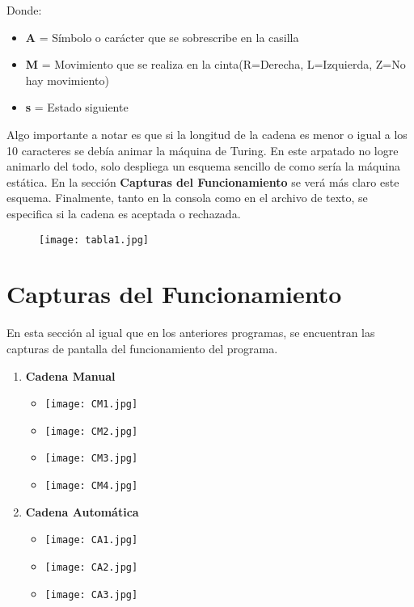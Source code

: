 \documentclass{article}
\begin{document}
	Donde: 
	\begin{itemize}
		\item \textbf{A} = Símbolo o carácter que se sobrescribe en la casilla
		\item \textbf{M} = Movimiento que se realiza en la cinta(R=Derecha, L=Izquierda, Z=No hay movimiento)
		\item \textbf{s} = Estado siguiente
		
	\end{itemize}
	
	Algo importante a notar es que si la longitud de la cadena es menor o igual a los 10 caracteres se debía animar la máquina de Turing. En este arpatado no logre animarlo del todo, solo despliega un esquema sencillo de como sería la máquina estática. En la sección \textbf{Capturas del Funcionamiento} se verá más claro este esquema.
	Finalmente, tanto en la consola como en el archivo de texto, se especifica si la cadena es aceptada o rechazada.
	
	\begin{figure}[h]
		\centering
		\texttt{[image: tabla1.jpg]}
	\end{figure}
	\section*{Capturas del Funcionamiento}
	En esta sección al igual que en los anteriores programas, se encuentran las capturas de pantalla del funcionamiento del programa.	
	\begin{enumerate}
		\item \textbf{Cadena Manual}
		\begin{itemize}
			\item \texttt{[image: CM1.jpg]}
			\item \texttt{[image: CM2.jpg]}
			\item \texttt{[image: CM3.jpg]}
			\item \texttt{[image: CM4.jpg]}
		\end{itemize}				
		\item \textbf{Cadena Automática}
		\begin{itemize}
			\item \texttt{[image: CA1.jpg]}
			\item \texttt{[image: CA2.jpg]}
			\item \texttt{[image: CA3.jpg]}
		\end{itemize}	
	\end{enumerate}
	
\end{document}
